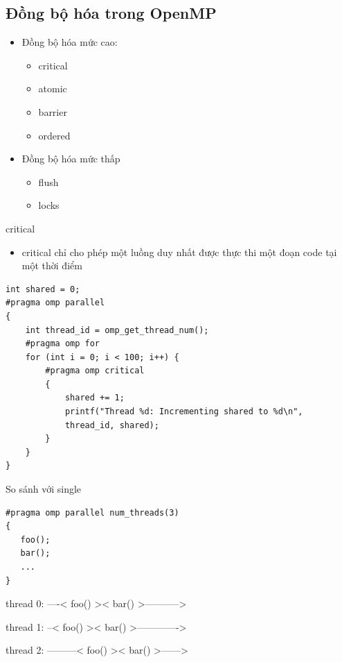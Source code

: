 \documentclass[10pt]{beamer}
\theoremstyle{remark}
\numberwithin{algocf}{section}
\numberwithin{equation}{section}
\numberwithin{dl}{section}
\numberwithin{figure}{section}
\begin{document}
\subsection{Đồng bộ hóa trong OpenMP}
\begin{frame}
    \begin{itemize}
        \item Đồng bộ hóa mức cao:
        \begin{itemize}
            \item critical
            \item atomic 
            \item barrier
            \item ordered
        \end{itemize}
        \item Đồng bộ hóa mức thấp
        \begin{itemize}
            \item flush
            \item locks
        \end{itemize}
    \end{itemize}
\end{frame}

\begin{frame}{critical}
    \begin{itemize}
        \item critical chỉ cho phép một luồng duy nhất được thực thi một đoạn code tại một thời điểm
    \end{itemize}

    \begin{verbatim}
int shared = 0;
#pragma omp parallel
{
    int thread_id = omp_get_thread_num();
    #pragma omp for
    for (int i = 0; i < 100; i++) {
        #pragma omp critical
        {
            shared += 1;
            printf("Thread %d: Incrementing shared to %d\n", 
            thread_id, shared);
        }
    }
}
    \end{verbatim}
    
\end{frame}

\begin{frame}[fragile]{So sánh với single}
    \begin{verbatim}
#pragma omp parallel num_threads(3)
{
   foo();
   bar();
   ...
}
    \end{verbatim}
thread 0: ----< foo() >< bar() >----------->

thread 1: --< foo() >< bar() >------------->

thread 2: ---------< foo() >< bar() >------>
\end{frame}
\end{document}
